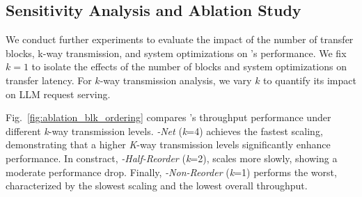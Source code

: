 {{\subsection{Sensitivity Analysis and Ablation Study}
\label{subsec:ablation_study}



We conduct further experiments to evaluate the impact
of the number of transfer blocks, k-way transmission, and
system optimizations on \SysName’s performance. We fix
$k=1$ to isolate the effects of the number of blocks and system optimizations on transfer latency. For $k$-way transmission analysis, we vary $k$ to quantify its impact on LLM request serving.


Fig.~\ref{fig:ablation_blk_ordering} compares 
\SysName's throughput performance under different \emph{k}-way transmission levels. \textit{\SysName-Net} (\emph{k}=4) achieves the fastest scaling, demonstrating that a higher \emph{K}-way transmission levels significantly enhance performance. In constract,  \textit{\SysName-Half-Reorder} (\emph{k}=2), scales more slowly, showing a moderate performance drop. Finally, \textit{\SysName-Non-Reorder} (\emph{k}=1) performs the worst, characterized by the slowest scaling and the lowest overall throughput.

}}

